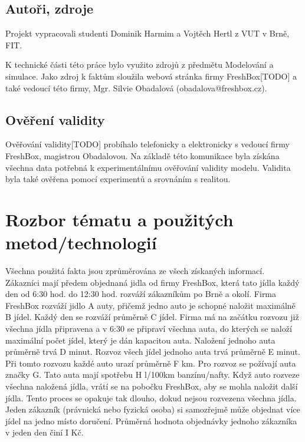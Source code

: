 \documentclass[a4paper, 11pt]{article}
\begin{document}
	\subsection{Autoři, zdroje}

	Projekt vypracovali studenti Dominik Harmim a Vojtěch Hertl z VUT v Brně, FIT. 

	K technické části této práce bylo využito zdrojů z předmětu Modelování a simulace. Jako zdroj k faktům sloužila webová stránka firmy FreshBox[TODO] a také vedoucí této firmy, Mgr. Silvie Obadalová (obadalova@freshbox.cz).

	\subsection{Ověření validity}

	Ověřování validity[TODO] probíhalo telefonicky a elektronicky s vedoucí firmy FreshBox, magistrou Obadalovou. Na základě této komunikace byla získána všechna data potřebná k experimentálnímu ověřování validity modelu. Validita byla také ověřena pomocí experimentů a srovnáním s realitou.
	\clearpage


	\section{Rozbor tématu a použitých metod/technologií}

	Všechna použitá fakta jsou zprůměrována ze všech získaných informací. \\

	Zákazníci mají předem objednaná jidla od firmy FreshBox, která tato jídla každý den od 6:30 hod. do 12:30 hod. rozváží zákazníkům po Brně a okolí. Firma FreshBox rozváží jidlo A auty, přičemž jedno auto je schopné naložit maximálně B jídel. Každý den se rozváží průměrně C jídel. Firma má na začátku rozvozu již všechna jídla připravena a v 6:30 se připraví všechna auta, do kterých se naloží maximální počet jídel, který je dán kapacitou auta. Naložení jednoho auta průměrně trvá D minut. Rozvoz všech jídel jednoho auta trvá průměrně E minut. Při tomto rozvozu každé auto urazí průměrně F km. Pro rozvoz se požívají auta značky G. Tato auta mají spotřebu H l/100km banzínu/nafty. Když auto rozveze všechna naložená jídla, vrátí se na pobočku FreshBox, aby se mohla naložit další jídla. Tento proces se opakuje tak dlouho, dokud nejsou rozvezena všechna jídla. Jeden zákazník (právnická nebo fyzická osoba) si samozřejmě může objednat více jídel na jedno místo doručení. Průměrná hodnota objednávky jednoho zákazníka v jeden den činí I Kč.
\end{document}
